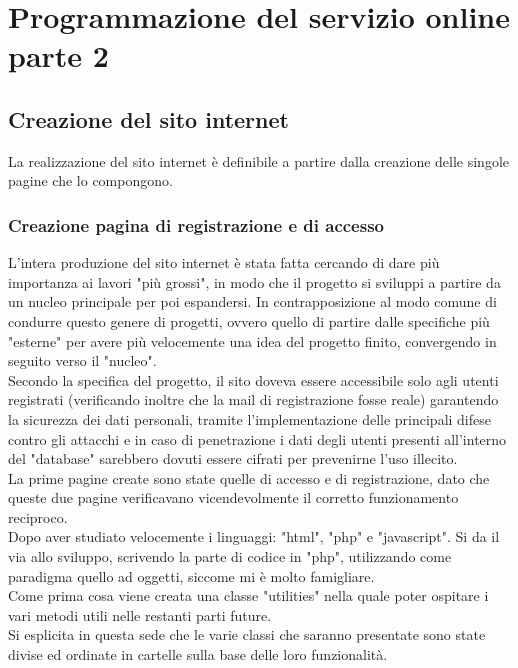 \chapter{Programmazione del servizio online parte 2}\label{cap:Programmazione del servizio online parte 2}

\section{Creazione del sito internet}\label{sez:Creazione sito internet}

La realizzazione del sito internet è definibile a partire dalla creazione delle singole pagine che lo compongono.\\%

\subsection{Creazione pagina di registrazione e di accesso}
L'intera produzione del sito internet è stata fatta cercando di dare più importanza ai lavori "più grossi", in modo che il progetto si sviluppi a partire da un nucleo principale per poi espandersi. In contrapposizione al  modo comune di  condurre questo genere di progetti, ovvero quello di partire dalle specifiche più "esterne" per  avere più velocemente una idea del progetto finito, convergendo in seguito verso il "nucleo".\\
Secondo la specifica del progetto, il sito doveva essere accessibile solo agli utenti registrati (verificando inoltre che la mail di registrazione fosse reale) garantendo la sicurezza dei dati personali, tramite l'implementazione delle principali difese contro gli attacchi e in caso di penetrazione i dati degli utenti presenti all'interno del "database" sarebbero dovuti essere cifrati per prevenirne l'uso illecito.\\
La prime pagine create sono state quelle di accesso e di registrazione, dato che queste due pagine verificavano vicendevolmente il corretto funzionamento reciproco.\\
\bigskip
Dopo aver studiato velocemente i linguaggi: "html", "php" e "javascript". Si da il via allo sviluppo, scrivendo la parte di codice in "php", utilizzando come paradigma quello ad oggetti, siccome mi è molto famigliare.\\
Come prima cosa viene creata una classe "utilities" nella quale poter ospitare i vari metodi utili nelle restanti parti future.\\
\bigskip
Si esplicita in questa sede che le varie classi che saranno presentate sono state divise ed ordinate in cartelle sulla base delle loro funzionalità.\\

